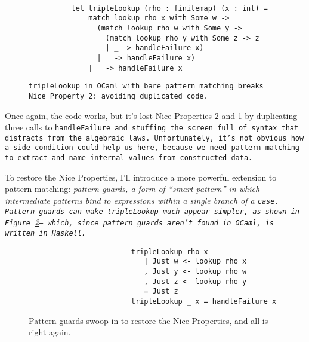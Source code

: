 \documentclass[manuscript,screen,review, 12pt, nonacm]{acmart}
\begin{document}
\begin{outline}[enumerate]
    \begin{figure}[ht]
        \begin{verbatim}

          let tripleLookup (rho : finitemap) (x : int) =
              match lookup rho x with Some w -> 
                (match lookup rho w with Some y -> 
                  (match lookup rho y with Some z -> z
                  | _ -> handleFailure x)
                | _ -> handleFailure x)
              | _ -> handleFailure x
            \end{verbatim}
        \caption{\tt{tripleLookup} in OCaml with bare pattern matching breaks
                    Nice Property 2: avoiding duplicated code. } 
                    
        \label{fig:pmtriplelookup}
    \end{figure}

    Once again, the code works, but it's lost Nice Properties 2 and 1 by
    duplicating three calls to \tt{handleFailure} and stuffing the screen full
    of syntax that distracts from the algebraic laws. Unfortunately, it's not
    obvious how a side condition could help us here, because we need pattern
    matching to extract and name internal values from constructed data.

    To restore the Nice Properties, I'll introduce a more powerful extension to
    pattern matching: \it{pattern guards}, a form of “smart pattern” in which
    intermediate patterns bind to expressions within a single branch of a
    \tt{case}. Pattern guards can make \tt{tripleLookup} \it{much} appear
    simpler, as shown in Figure~\ref{fig:guardtriplelookup}-- which, since
    pattern guards aren't found in OCaml, is written in Haskell.

    \begin{figure}[hbt!]  
        \begin{center}
        \begin{verbatim}
                        tripleLookup rho x
                           | Just w <- lookup rho x
                           , Just y <- lookup rho w
                           , Just z <- lookup rho y
                           = Just z
                        tripleLookup _ x = handleFailure x
        \end{verbatim}
        \end{center}    
    \caption{Pattern guards swoop in to restore the Nice Properties, and all is
    right again.} 
    \label{fig:guardtriplelookup}
    \end{figure}


\end{outline}
\end{document}
